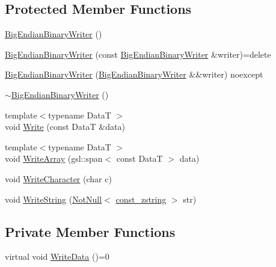 \subsection*{Protected Member Functions}
\begin{DoxyCompactItemize}
\item 
\hyperlink{classmage_1_1_big_endian_binary_writer_ac0917b684913834577d4850269a6c09a}{Big\+Endian\+Binary\+Writer} ()
\item 
\hyperlink{classmage_1_1_big_endian_binary_writer_aafe65752342b2740e7293878ae469d9f}{Big\+Endian\+Binary\+Writer} (const \hyperlink{classmage_1_1_big_endian_binary_writer}{Big\+Endian\+Binary\+Writer} \&writer)=delete
\item 
\hyperlink{classmage_1_1_big_endian_binary_writer_aaf2dcf536afefc7b0ca8b0752024311d}{Big\+Endian\+Binary\+Writer} (\hyperlink{classmage_1_1_big_endian_binary_writer}{Big\+Endian\+Binary\+Writer} \&\&writer) noexcept
\item 
\hyperlink{classmage_1_1_big_endian_binary_writer_ab717bcbfc15ba4a1cb25eeb564e120b8}{$\sim$\+Big\+Endian\+Binary\+Writer} ()
\item 
{\footnotesize template$<$typename DataT $>$ }\\void \hyperlink{classmage_1_1_big_endian_binary_writer_a5df1ef09f8a9a452ffbe9fd3fad1a16a}{Write} (const DataT \&data)
\item 
{\footnotesize template$<$typename DataT $>$ }\\void \hyperlink{classmage_1_1_big_endian_binary_writer_adc489a899f0add4b06ff6b669dc2ebd5}{Write\+Array} (gsl\+::span$<$ const DataT $>$ data)
\item 
void \hyperlink{classmage_1_1_big_endian_binary_writer_a869eff3f6e0666406bd5470af3e02096}{Write\+Character} (char c)
\item 
void \hyperlink{classmage_1_1_big_endian_binary_writer_acf065a2e7462c9e6cf46849bd2c9d2e7}{Write\+String} (\hyperlink{namespacemage_a8769f9d670d6b585ea306cb1062af94b}{Not\+Null}$<$ \hyperlink{namespacemage_abfd9206dc607ceb5d13ec68bf075a5c0}{const\+\_\+zstring} $>$ str)
\end{DoxyCompactItemize}
\subsection*{Private Member Functions}
\begin{DoxyCompactItemize}
\item 
virtual void \hyperlink{classmage_1_1_big_endian_binary_writer_a719581274b1b185ef05687183f7ded25}{Write\+Data} ()=0
\end{DoxyCompactItemize}
